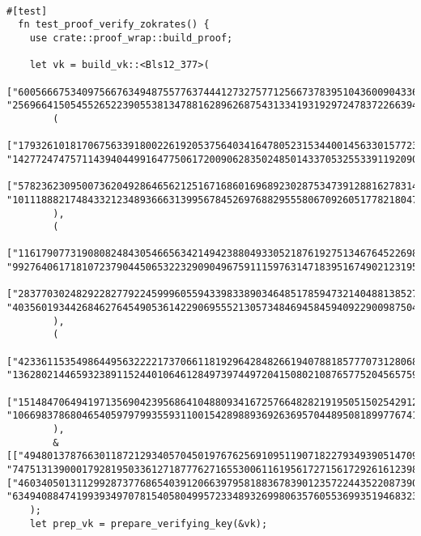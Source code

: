 \documentclass{article}
\begin{document}
\begin{lstlisting}
  
#[test]
  fn test_proof_verify_zokrates() {
    use crate::proof_wrap::build_proof;

    let vk = build_vk::<Bls12_377>(
        ["60056667534097566763494875577637444127327577125667378395104360090433601281821073015262935791939615206969974985807", "256966415054552652239055381347881628962687543133419319297247837226639466725550973295768665146208628522797884612532"],
        (
            ["179326101817067563391800226192053756403416478052315344001456330157723906474308378357131917251349287820912488875216", "142772474757114394044991647750617200906283502485014337053255339119209019009345711113533581456207046253540462419113"],
            ["57823623095007362049286465621251671686016968923028753473912881627831409733399159258656322440482090204289401420390", "101118882174843321234893666313995678452697688295558067092605177821804773495091187819872483394205519149832113555085"],
        ),
        (
            ["11617907731908082484305466563421494238804933052187619275134676452269894898983076561079708969471115033175497288840", "99276406171810723790445065322329090496759111597631471839516749021231950281241339835395303648287892964833344966582"],
            ["28377030248292282779224599960559433983389034648517859473214048813852768827884198220249094226263418918225188281911", "40356019344268462764549053614229069555213057348469458459409229009875049976022708987189332901989722293448063024604"],
        ),
        (
            ["42336115354986449563222217370661181929642848266194078818577707312806800307086036834098914403582575814880913453381", "13628021446593238911524401064612849739744972041508021087657752045657598279495029493256485816948094524005775965340"],
            ["151484706494197135690423956864104880934167257664828219195051502542912986111558842872420005005007856459649370787395", "106698378680465405979799355931100154289889369263695704489508189977674129976186904452368213544558823954831378219999"]
        ),
        &[["49480137876630118721293405704501976762569109511907182279349390514709028541679857128154384581593933158967873027339", "74751313900017928195033612718777627165530061161956172715617292616123988275146405258067008099746094173381613927388"], ["46034050131129928737768654039120663979581883678390123572244352208739077146930962284601941313470678196963319006322", "63494088474199393497078154058049957233489326998063576055369935194683236608833107071159288686514522146509792946199"]],
    );
    let prep_vk = prepare_verifying_key(&vk);


\end{lstlisting}
\end{document}
